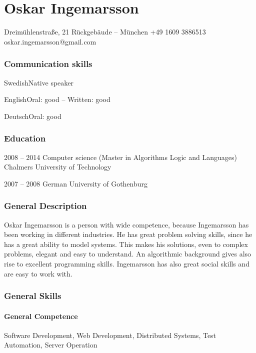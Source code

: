 \documentclass[fontsize=10pt]{tccv}
\begin{document}
\part{Oskar Ingemarsson}

\personal
    {Dreimühlenstra{\ss}e, 21 Rückgebäude -- München}
    {+49 1609 3886513}
    {oskar.ingemarsson@gmail.com}

\section{Communication skills}

\begin{factlist}
\item{Swedish}{Native speaker}
\item{English}{Oral: good -- Written: good}
\item{Deutsch}{Oral: good}
\end{factlist}

\section{Education}

\begin{yearlist}
\item{2008 -- 2014}
     {Computer science (Master in Algorithms Logic and Languages)}
     {Chalmers University of Technology}
\item{2007 -- 2008}
    {German}
    {University of Gothenburg}
\end{yearlist}

\section{General Description}
Oskar Ingemarsson is a person with wide competence, because Ingemarsson has
been working in different industries. He has great problem solving skills,
since he has a great ability to model systems. This makes his solutions, even
to complex problems, elegant and easy to understand. An algorithmic background
gives also rise to excellent programming skills. Ingemarsson has also great
social skills and are easy to work with.


\section{General Skills}

\subsection{General Competence}
Software Development,
Web Development,
Distributed Systems,
Test Automation,
Server Operation
\end{document}
